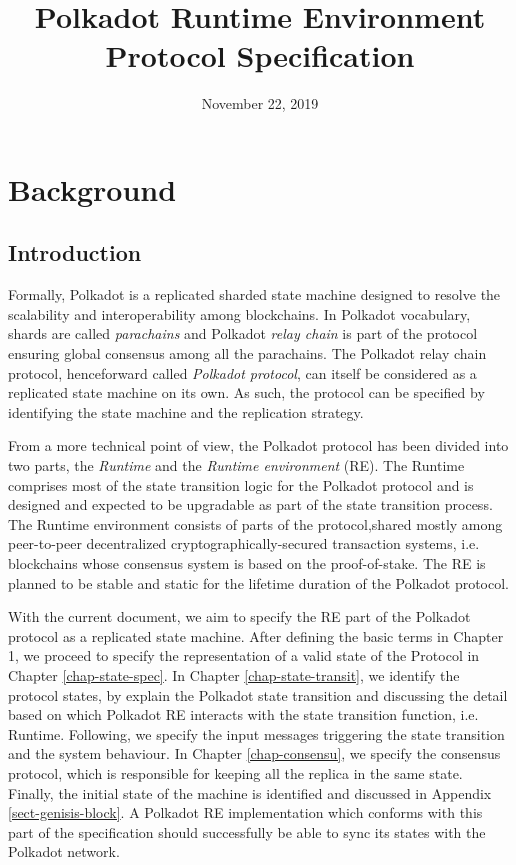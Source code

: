 \documentclass{book}
\newcommand{\tmem}[1]{{\em #1\/}}
\newcommand{\tmtextit}[1]{{\itshape{#1}}}
\providecommand{\tmem}[1]{\tmtextit{#1}}
\providecommand{\tmtextit}[1]{\tmtextit{#1}}
\begin{document}
\title{
  Polkadot Runtime Environment\\
  {\Large Protocol Specification}
}

\date{November 22, 2019}

\maketitle

{\tableofcontents}

\chapter{Background}

\section{Introduction}

Formally, Polkadot is a replicated sharded state machine designed to resolve
the scalability and interoperability among blockchains. In Polkadot
vocabulary, shards are called {\tmem{parachains}} and Polkadot {\tmem{relay
chain}} is part of the protocol ensuring global consensus among all the
parachains. The Polkadot relay chain protocol, henceforward called
{\tmem{Polkadot protocol}}, can itself be considered as a replicated state
machine on its own. As such, the protocol can be specified by identifying the
state machine and the replication strategy.

From a more technical point of view, the Polkadot protocol has been divided
into two parts, the {\tmem{Runtime}} and the {\tmem{Runtime environment}}
(RE). The Runtime comprises most of the state transition logic for the
Polkadot protocol and is designed and expected to be upgradable as part of the
state transition process. The Runtime environment consists of parts of the
protocol,\quad shared mostly among peer-to-peer decentralized
cryptographically-secured transaction systems, i.e. blockchains whose
consensus system is based on the proof-of-stake. The RE is planned to be
stable and static for the lifetime duration of the Polkadot protocol.

With the current document, we aim to specify the RE part of the Polkadot
protocol as a replicated state machine. After defining the basic terms in
Chapter 1, we proceed to specify the representation of a valid state of the
Protocol in Chapter \ref{chap-state-spec}. In Chapter
\ref{chap-state-transit}, we identify the protocol states, by explain the
Polkadot state transition and discussing the detail based on which Polkadot RE
interacts with the state transition function, i.e. Runtime. Following, we
specify the input messages triggering the state transition and the system
behaviour. In Chapter \ref{chap-consensu}, we specify the consensus protocol,
which is responsible for keeping all the replica in the same state. Finally,
the initial state of the machine is identified and discussed in Appendix
\ref{sect-genisis-block}. A Polkadot RE implementation which conforms with
this part of the specification should successfully be able to sync its states
with the Polkadot network.
\end{document}
